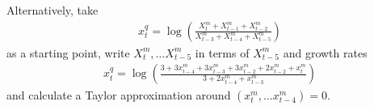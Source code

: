 Alternatively, take 
\begin{align}
x^q_t = \log\left(\frac{X^m_t + X^m_{t-1} + X^m_{t-2}}{X^m_{t-3} + X^m_{t-4} + X^m_{t-5}}\right)
\end{align}
as a starting point, write $X^m_t, \dots X^m_{t-5}$ in terms of $X^m_{t-5}$ and growth rates 
\begin{align}
x^q_t = \log\left(\frac{3 + 3x^m_{t-4} + 3x^m_{t-3} + 3x^m_{t-2} + 2x^m_{t-2} +x^m_t}{3 + 2x^m_{t-4} + x^m_{t-3}}\right)
\end{align}
and calculate a Taylor approximation around $(x^m_t, \dots x^m_{t-4}) = 0$.\\

